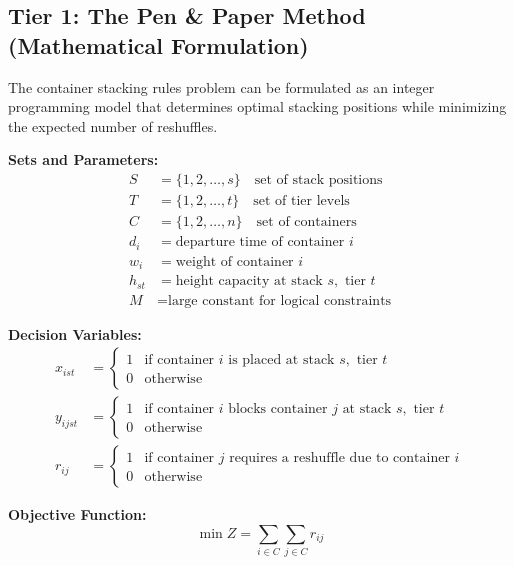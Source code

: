 \documentclass{article}
\begin{document}
\subsection{Tier 1: The Pen \& Paper Method (Mathematical Formulation)}

The container stacking rules problem can be formulated as an integer programming model that determines optimal stacking positions while minimizing the expected number of reshuffles.

\textbf{Sets and Parameters:}
\begin{align}
S &= \{1, 2, \ldots, s\} \quad \text{set of stack positions} \\
T &= \{1, 2, \ldots, t\} \quad \text{set of tier levels} \\
C &= \{1, 2, \ldots, n\} \quad \text{set of containers} \\
d_i &= \text{departure time of container } i \\
w_i &= \text{weight of container } i \\
h_{st} &= \text{height capacity at stack } s, \text{ tier } t \\
M &= \text{large constant for logical constraints}
\end{align}

\textbf{Decision Variables:}
\begin{align}
x_{ist} &= \begin{cases} 
1 & \text{if container } i \text{ is placed at stack } s, \text{ tier } t \\
0 & \text{otherwise}
\end{cases} \\
y_{ijst} &= \begin{cases}
1 & \text{if container } i \text{ blocks container } j \text{ at stack } s, \text{ tier } t \\
0 & \text{otherwise}
\end{cases} \\
r_{ij} &= \begin{cases}
1 & \text{if container } j \text{ requires a reshuffle due to container } i \\
0 & \text{otherwise}
\end{cases}
\end{align}

\textbf{Objective Function:}
\[
\min Z = \sum_{i \in C} \sum_{j \in C} r_{ij}
\]
\end{document}
